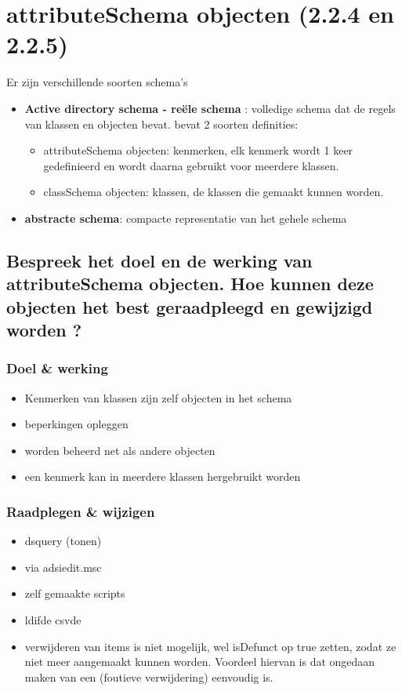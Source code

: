 \chapter{attributeSchema objecten (2.2.4 en 2.2.5)}
\npar
Er zijn verschillende soorten schema's
\begin{itemize}
\item \textbf{Active directory schema - re\"ele schema} : volledige schema dat de regels van klassen en objecten bevat.
bevat 2 soorten definities:
\begin{itemize}
\item attributeSchema objecten: kenmerken, elk kenmerk wordt 1 keer gedefinieerd en wordt daarna gebruikt voor meerdere klassen.
\item classSchema objecten: klassen, de klassen die gemaakt kunnen worden.
\end{itemize}
\item \textbf{abstracte schema}: compacte representatie van het gehele schema
\end{itemize}

\section{Bespreek het doel en de werking van attributeSchema objecten. Hoe kunnen deze objecten het best geraadpleegd en gewijzigd worden ?}

\subsection{Doel \& werking}
\begin{itemize}
\item Kenmerken van klassen zijn zelf objecten in het schema
\item beperkingen opleggen
\item worden beheerd net als andere objecten
\item een kenmerk kan in meerdere klassen hergebruikt worden
\end{itemize}

\subsection{Raadplegen \& wijzigen}
\begin{itemize}
\item dsquery (tonen)
\item via adsiedit.msc
\item zelf gemaakte scripts
\item ldifde csvde
\item verwijderen van items is niet mogelijk, wel isDefunct op true zetten, zodat ze niet meer aangemaakt kunnen worden. Voordeel hiervan is dat ongedaan maken van een (foutieve verwijdering) eenvoudig is.
\end{itemize}

